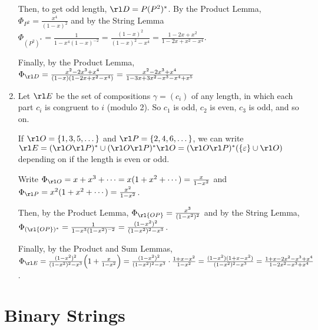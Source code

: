 \documentclass[class=math239,notes,tikz]{agony}
\begin{document}
\begin{enumerate}
\begin{sol}
          Then, to get odd length, $\rl D = P(P^2)^*$.
          By the Product Lemma, $\Phi_{P^2} = \frac{x^4}{(1-x)^2}$
          and by the String Lemma $\Phi_{(P^2)^*} = \frac{1}{1-x^4(1-x)^{-2}}
            = \frac{(1-x)^2}{(1-x)^2-x^4} = \frac{1-2x+x^2}{1-2x+x^2-x^4}$.

          Finally, by the Product Lemma, $\Phi_{\rl D} = \frac{x^2-2x^3+x^4}{(1-x)(1-2x+x^2-x^4)}
            = \frac{x^2-2x^3+x^4}{1-3x+3x^2-x^3-x^4+x^5}$
        \end{sol}
  \item Let $\rl E$ be the set of compositions $\gamma = (c_i)$ of any length,
        in which each part $c_i$ is congruent to $i$ (modulo 2).
        So $c_1$ is odd, $c_2$ is even, $c_3$ is odd, and so on.
        \begin{sol}
          If $\rl O = \{1,3,5,\dotsc\}$ and $\rl P = \{2,4,6,\dotsc\}$,
          we can write $\rl E = (\rl O\rl P)^* \cup (\rl O\rl P)^*\rl O
            = (\rl O\rl P)^*(\{\varepsilon\} \cup \rl O)$
          depending on if the length is even or odd.

          Write $\Phi_{\rl O} = x + x^3 + \dotsb = x(1 + x^2 + \dotsb) = \frac{x}{1-x^2}$
          and $\Phi_{\rl P} = x^2(1 + x^2 + \dotsb) = \frac{x^2}{1-x^2}$.

          Then, by the Product Lemma, $\Phi_{\rl{OP}} = \frac{x^3}{(1-x^2)^2}$
          and by the String Lemma, $\Phi_{(\rl{OP})^*} = \frac{1}{1-x^3(1-x^2)^{-2}}
            = \frac{(1-x^2)^2}{(1-x^2)^2-x^3}$.

          Finally, by the Product and Sum Lemmas,
          $\Phi_{\rl E} = \frac{(1-x^2)^2}{(1-x^2)^2-x^3}\qty(1+\frac{x}{1-x^2})
            = \frac{(1-x^2)^2}{(1-x^2)^2-x^3}\cdot\frac{1+x-x^2}{1-x^2}
            = \frac{(1-x^2)(1+x-x^2)}{(1-x^2)^2-x^3}
            = \frac{1+x-2x^2-x^3+x^4}{1-2x^2-x^3+x^4}$.
        \end{sol}
\end{enumerate}

\section{Binary Strings}
\end{document}
